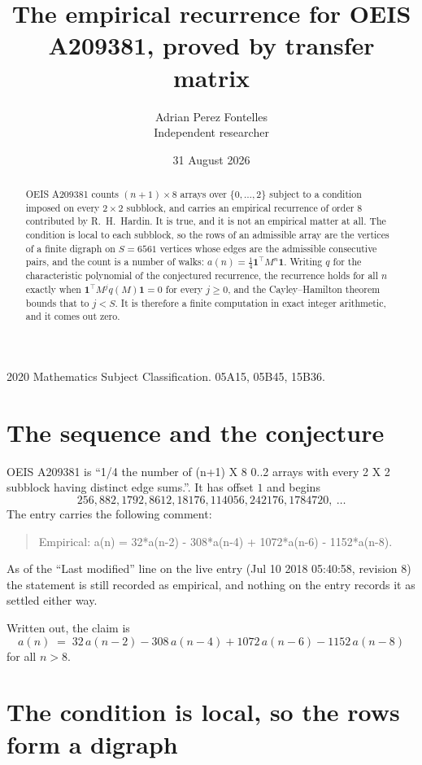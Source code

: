 \documentclass[11pt,a4paper]{article}
\title{The empirical recurrence for OEIS A209381, proved by transfer matrix}
\author{Adrian Perez Fontelles\\ \small Independent researcher}
\date{31 August 2026}
\theoremstyle{plain}
\theoremstyle{definition}
\begin{document}
\maketitle

\begin{abstract}
OEIS A209381 counts $(n+1)\times8$ arrays over $\{0,\dots,2\}$ subject to a condition imposed on
every $2\times2$ subblock, and carries an empirical recurrence of order $8$ contributed
by R.~H.~Hardin. It is true, and it is not an empirical matter at all. The condition is local
to each subblock, so the rows of an admissible array are the vertices of a finite digraph
on $S=6561$ vertices whose edges are the admissible consecutive pairs, and the count is a
number of walks: $a(n)=\tfrac1{4}\mathbf{1}^{\!\top}M^{n}\mathbf{1}$. Writing $q$
for the characteristic polynomial of the conjectured recurrence, the recurrence holds for all
$n$ exactly when $\mathbf{1}^{\!\top}M^{j}q(M)\mathbf{1}=0$ for every $j\ge0$, and the
Cayley--Hamilton theorem bounds that to $j<S$. It is therefore a finite computation in exact
integer arithmetic, and it comes out zero.
\end{abstract}

\noindent\small 2020 Mathematics Subject Classification. 05A15, 05B45, 15B36.\normalsize

\section{The sequence and the conjecture}

OEIS A209381 is ``1/4 the number of (n+1) X 8 0..2 arrays with every 2 X 2 subblock having distinct edge sums.''. It has offset $1$ and begins
\[
256, 882, 1792, 8612, 18176, 114056, 242176, 1784720,\ \dots
\]
The entry carries the following comment:
\begin{quote}\small
Empirical: a(n) = 32*a(n-2) - 308*a(n-4) + 1072*a(n-6) - 1152*a(n-8).
\end{quote}
As of the ``Last modified'' line on the live entry (Jul 10 2018 05:40:58, revision 8) the statement is
still recorded as empirical, and nothing on the entry records it as settled either way.

Written out, the claim is
\begin{equation}\label{eq:conj}
a(n)\;=\;32\,a(n-2) - 308\,a(n-4) + 1072\,a(n-6) - 1152\,a(n-8)
\end{equation}
for all $n>8$.

\section{The condition is local, so the rows form a digraph}
\end{document}

